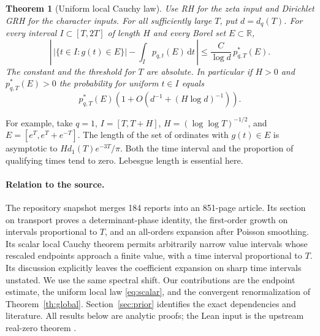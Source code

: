 \documentclass[11pt]{article}
\newtheorem{theorem}{Theorem}
\newcommand{\R}{\mathbb R}\newcommand{\C}{\mathbb C}
\newcommand{\dd}{\,\mathrm d}\newcommand{\ii}{\mathrm i}
\begin{document}
\begin{theorem}[Uniform local Cauchy law]\label{th:scalar}
Use RH for the zeta input and Dirichlet GRH for the character inputs. For all sufficiently large $T$, put $d=d_q(T)$. For every interval $I\subset[T,2T]$ of length $H$ and every Borel set $E\subset\R$,
\begin{equation}\label{eq:scalar}
 \left|\, |\{t\in I:g(t)\in E\}|-\int_I p_{q,t}(E)\dd t\,\right|
 \le \frac{C}{\log d}\,p^*_{q,T}(E).
\end{equation}
The constant and the threshold for $T$ are absolute. In particular if $H>0$ and $p^*_{q,T}(E)>0$ the probability for uniform $t\in I$ equals
\begin{equation}\label{eq:rel}
 p^*_{q,T}(E)\left(1+O\left(d^{-1}+(H\log d)^{-1}\right)\right).
\end{equation}
\end{theorem}

For example, take $q=1$, $I=[T,T+H]$, $H=(\log\log T)^{-1/2}$, and $E=[e^T,e^T+e^{-T}]$. The length of the set of ordinates with $g(t)\in E$ is asymptotic to $H d_1(T)e^{-3T}/\pi$. Both the time interval and the proportion of qualifying times tend to zero. Lebesgue length is essential here.

\paragraph{Relation to the source.}
The repository snapshot \cite{repo} merges 184 reports into an 851-page article. Its section on transport proves a determinant-phase identity, the first-order growth on intervals proportional to $T$, and an all-orders expansion after Poisson smoothing. Its scalar local Cauchy theorem permits arbitrarily narrow value intervals whose rescaled endpoints approach a finite value, with a time interval proportional to $T$. Its discussion explicitly leaves the coefficient expansion on sharp time intervals unstated. We use the same spectral shift. Our contributions are the endpoint estimate, the uniform local law \eqref{eq:scalar}, and the convergent renormalization of Theorem~\ref{th:global}. Section~\ref{sec:prior} identifies the exact dependencies and literature. All results below are analytic proofs; the Lean input is the upstream real-zero theorem \cite{lean}.
\end{document}
